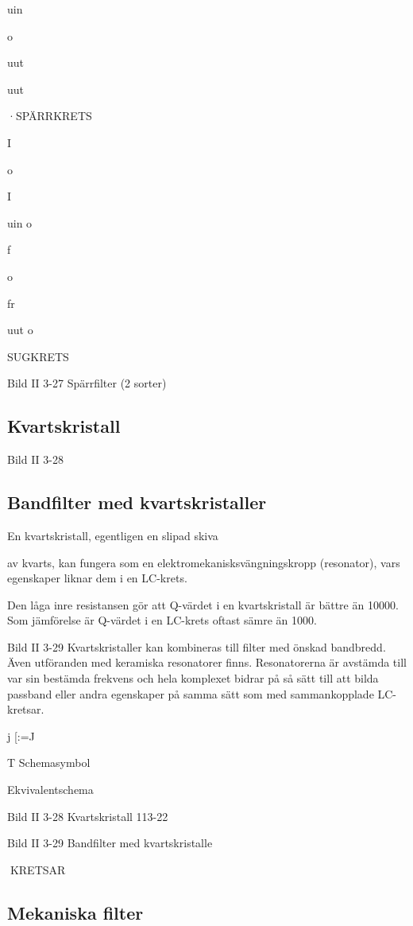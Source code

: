 {uin

o

uut

uut

·SPÄRRKRETS

I

o

I

uin
o

f

o

fr

uut
o

SUGKRETS

Bild II 3-27 Spärrfilter (2 sorter)

\subsection{Kvartskristall}
Bild II 3-28

\subsection{Bandfilter med kvartskristaller}

En kvartskristall, egentligen en slipad skiva

av kvarts, kan fungera som en elektromekanisksvängningskropp (resonator), vars egenskaper liknar dem i en LC-krets.

Den låga inre resistansen gör att Q-värdet i en kvartskristall är bättre än 10000.
Som jämförelse är Q-värdet i en LC-krets
oftast sämre än 1000.

Bild II 3-29
Kvartskristaller kan kombineras till filter med
önskad bandbredd. Även utföranden med
keramiska resonatorer finns.
Resonatorerna är avstämda till var sin
bestämda frekvens och hela komplexet bidrar på så sätt till att bilda passband eller
andra egenskaper på samma sätt som med
sammankopplade LC-kretsar.

j
[:=J

T
Schemasymbol

Ekvivalentschema

Bild II 3-28 Kvartskristall
113-22

Bild II 3-29 Bandfilter med kvartskristalle

KRETSAR
\subsection{Mekaniska filter}

}
